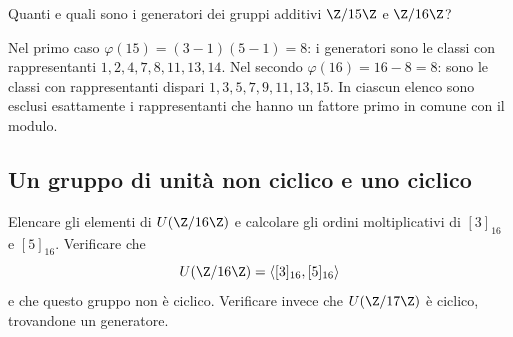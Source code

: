 \begin{esercizio}
Quanti e quali sono i generatori dei gruppi additivi $\Z/15\Z$ e $\Z/16\Z$?
\end{esercizio}
\begin{svolgimento}
Nel primo caso $\varphi(15)=(3-1)(5-1)=8$: i generatori sono le classi con rappresentanti $1,2,4,7,8,11,13,14$. Nel secondo $\varphi(16)=16-8=8$: sono le classi con rappresentanti dispari $1,3,5,7,9,11,13,15$. In ciascun elenco sono esclusi esattamente i rappresentanti che hanno un fattore primo in comune con il modulo.
\end{svolgimento}

\subsection{Un gruppo di unità non ciclico e uno ciclico}
\begin{esercizio}
Elencare gli elementi di $U(\Z/16\Z)$ e calcolare gli ordini moltiplicativi di $[3]_{16}$ e $[5]_{16}$. Verificare che
\[
U(\Z/16\Z)=\langle[3]_{16},[5]_{16}\rangle
\]
e che questo gruppo non è ciclico. Verificare invece che $U(\Z/17\Z)$ è ciclico, trovandone un generatore.
\end{esercizio}
